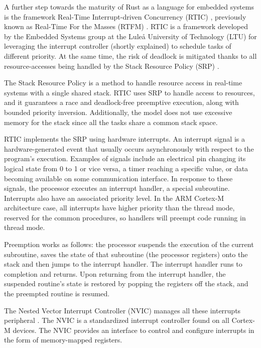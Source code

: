A further step towards the maturity of Rust as a language for embedded systems is the framework Real-Time Interrupt-driven Concurrency (RTIC) \cite{rtic}, previously known as Real-Time For the Masses (RTFM) \cite{eriksson2013real}. RTIC is a framework developed by the Embedded Systems group at the Luleå University of Technology (LTU) for leveraging the interrupt controller (shortly explained) to schedule tasks of different priority. At the same time, the risk of deadlock is mitigated thanks to all resource-accesses being handled by the Stack Resource Policy (SRP) \cite{baker1990stack}.

The Stack Resource Policy is a method to handle resource access in real-time systems with a single shared stack. RTIC uses SRP to handle access to resources, and it guarantees a race and deadlock-free preemptive execution, along with bounded priority inversion. Additionally, the model does not use excessive memory for the stack since all the tasks share a common stack space.

RTIC implements the SRP using hardware interrupts. An interrupt signal is a hardware-generated event that usually occurs asynchronously with respect to the program's execution. Examples of signals include an electrical pin changing its logical state from 0 to 1 or vice versa, a timer reaching a specific value, or data becoming available on some communication interface. In response to these signals, the processor executes an interrupt handler, a special subroutine. Interrupts also have an associated priority level. In the ARM Cortex-M architecture case, all interrupts have higher priority than the thread mode, reserved for the common procedures, so handlers will preempt code running in thread mode.

Preemption works as follows: the processor suspends the execution of the current subroutine, saves the state of that subroutine (the processor registers) onto the stack and then jumps to the interrupt handler. The interrupt handler runs to completion and returns. Upon returning from the interrupt handler, the suspended routine's state is restored by popping the registers off the stack, and the preempted routine is resumed.

The Nested Vector Interrupt Controller (NVIC) manages all these interrupts peripheral \cite{joseph2014definitive}. The NVIC is a standardized interrupt controller found on all Cortex-M devices. The NVIC provides an interface to control and configure interrupts in the form of memory-mapped registers.

